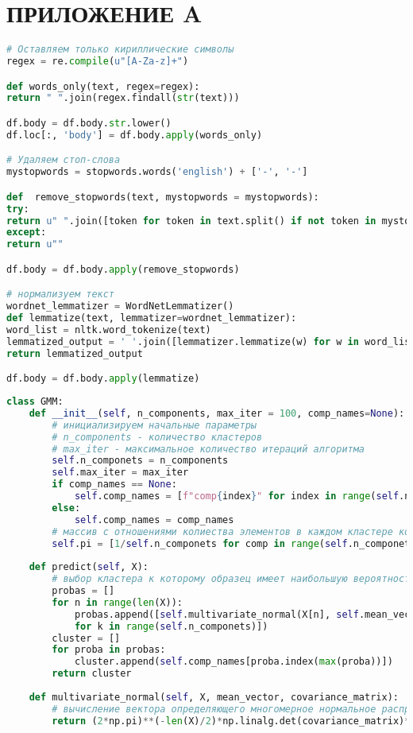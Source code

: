 \section*{ПРИЛОЖЕНИЕ A}


\begin{lstlisting}[language=Python, caption=Предобработка текста.]
# Оставляем только кириллические символы
regex = re.compile(u"[A-Za-z]+")

def words_only(text, regex=regex):
return " ".join(regex.findall(str(text)))

df.body = df.body.str.lower()
df.loc[:, 'body'] = df.body.apply(words_only)

# Удаляем стоп-слова
mystopwords = stopwords.words('english') + ['-', '-']

def  remove_stopwords(text, mystopwords = mystopwords):
try:
return u" ".join([token for token in text.split() if not token in mystopwords])
except:
return u""

df.body = df.body.apply(remove_stopwords)   

# нормализуем текст
wordnet_lemmatizer = WordNetLemmatizer()
def lemmatize(text, lemmatizer=wordnet_lemmatizer):
word_list = nltk.word_tokenize(text)
lemmatized_output = ' '.join([lemmatizer.lemmatize(w) for w in word_list])
return lemmatized_output

df.body = df.body.apply(lemmatize)
\end{lstlisting}
\pagebreak
\setcounter{lstlisting}{0}
\renewcommand\thelstlisting{2.\arabic{lstlisting}}

\begin{lstlisting}[language=Python, caption=Реализация модели Гауссовой смеси.]
class GMM:
	def __init__(self, n_components, max_iter = 100, comp_names=None):
		# инициализируем начальные параметры
		# n_components - количество кластеров
		# max_iter - максимальное количество итераций алгоритма
		self.n_componets = n_components
		self.max_iter = max_iter
		if comp_names == None:
			self.comp_names = [f"comp{index}" for index in range(self.n_componets)]
		else:
			self.comp_names = comp_names
		# массив с отношениями колиества элементов в каждом кластере ко всем элементам данных
		self.pi = [1/self.n_componets for comp in range(self.n_componets)]
		
	def predict(self, X):
		# выбор кластера к которому образец имеет наибольшую вероятность попадания
		probas = []
		for n in range(len(X)):
			probas.append([self.multivariate_normal(X[n], self.mean_vector[k], self.covariance_matrixes[k])
			for k in range(self.n_componets)])
		cluster = []
		for proba in probas:
			cluster.append(self.comp_names[proba.index(max(proba))])
		return cluster
	
	def multivariate_normal(self, X, mean_vector, covariance_matrix):
		# вычисление вектора определяющего многомерное нормальное распределение
		return (2*np.pi)**(-len(X)/2)*np.linalg.det(covariance_matrix)**(-1/2)*np.exp(-np.dot(np.dot((X-mean_vector).T, np.linalg.inv(covariance_matrix)), (X-mean_vector))/2)
\end{lstlisting}
\pagebreak

